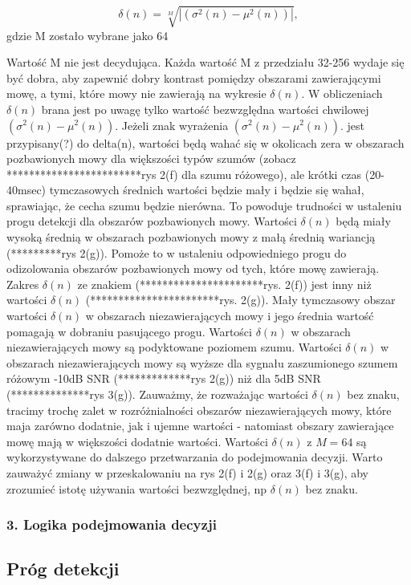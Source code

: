 \documentclass[eng,printmode]{mgr}
\begin{document}
   $$\delta(n) =\sqrt[M]{|{(\sigma^2(n) - \mu^2(n))}|},$$ gdzie M zostało wybrane jako 64
   
    Wartość M nie jest decydująca. Każda wartość M z przedziału 32-256 wydaje się być dobra, aby zapewnić dobry kontrast pomiędzy obszarami zawierającymi mowę, a tymi, które mowy nie zawierają na wykresie $\delta(n)$. W obliczeniach $\delta(n)$ brana jest po uwagę tylko wartość bezwzględna wartości chwilowej $(\sigma^2(n) - \mu^2(n))$. Jeżeli znak wyrażenia $(\sigma^2(n) - \mu^2(n))$. jest przypisany(?) do delta(n), wartości będą wahać się w okolicach zera w obszarach pozbawionych mowy dla większości typów szumów (zobacz ************************rys 2(f) dla szumu różowego), ale krótki czas (20-40msec) tymczasowych średnich wartości będzie mały i będzie się wahał, sprawiając, że cecha szumu będzie nierówna. To powoduje trudności w ustaleniu progu detekcji dla obszarów pozbawionych mowy. Wartości $\delta(n)$ będą miały wysoką średnią w obszarach pozbawionych mowy z małą średnią wariancją (*********rys 2(g)). Pomoże to w ustaleniu odpowiedniego progu do odizolowania obszarów pozbawionych mowy od tych, które mowę zawierają. Zakres $\delta(n)$ ze znakiem (**********************rys. 2(f)) jest inny niż wartości $\delta(n)$ (***********************rys. 2(g)). Mały tymczasowy obszar wartości $\delta(n)$ w obszarach niezawierających  mowy i jego średnia wartość pomagają w dobraniu pasującego progu. Wartości $\delta(n)$ w obszarach niezawierających mowy są podyktowane poziomem szumu. Wartości $\delta(n)$ w obszarach niezawierających mowy są wyższe dla sygnału zaszumionego szumem różowym -10dB SNR (*************rys 2(g)) niż dla 5dB SNR (**************rys 3(g)). Zauważmy, że rozważając wartości  $\delta(n)$ bez znaku, tracimy trochę zalet w rozróżnialności obszarów niezawierających mowy, które maja zarówno dodatnie, jak i ujemne wartości - natomiast obszary zawierające mowę mają w większości dodatnie wartości. Wartości $\delta(n)$ z $M=64$ są wykorzystywane do dalszego przetwarzania do podejmowania decyzji. Warto zauważyć zmiany w przeskalowaniu na rys 2(f) i 2(g) oraz 3(f) i 3(g), aby zrozumieć istotę używania wartości bezwzględnej, np $\delta(n)$ bez znaku.
    
  \subsubsection{3. Logika podejmowania decyzji}
  
  \subsection{Próg detekcji}
\end{document}

